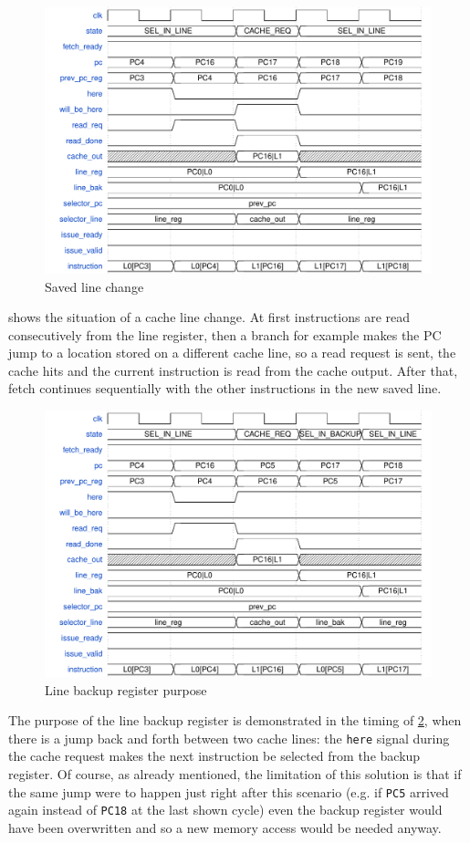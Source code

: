 \begin{figure}[!hb]
  \centering
  \includegraphics[scale=.7]{img/fetch06.pdf}
  \caption{Saved line change}
  \label{fig:fetch06}
\end{figure}
 shows the situation of a cache line change. At first instructions are read consecutively from the line register, then a branch for example makes the \ac{PC} jump to a location stored on a different cache line, so a read request is sent, the cache hits and the current instruction is read from the cache output. After that, fetch continues sequentially with the other instructions in the new saved line.

\pagebreak
\begin{figure}[!ht]
  \centering
  \includegraphics[width=\textwidth]{img/fetch09.pdf}
  \caption{Line backup register purpose}
  \label{fig:fetch09}
\end{figure}
The purpose of the line backup register is demonstrated in the timing of \cref{fig:fetch09}, when there is a jump back and forth between two cache lines: the \texttt{here} signal during the cache request makes the next instruction be selected from the backup register. Of course, as already mentioned, the limitation of this solution is that if the same jump were to happen just right after this scenario (e.g. if \texttt{PC5} arrived again instead of \texttt{PC18} at the last shown cycle) even the backup register would have been overwritten and so a new memory access would be needed anyway.

